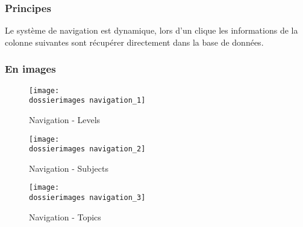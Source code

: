 \subsubsection{Principes}
Le système de navigation est dynamique, lors d'un clique les informations de la colonne suivantes sont récupérer directement dans la base de données.

\subsubsection{En images}

\begin{figure}[H]
   	\begin{minipage}[c]{.46\linewidth}
		\texttt{[image: \\dossierimages navigation\_1]}
		\caption{Navigation - Levels}
		\label{Navigation - Levels}
   	\end{minipage} \hfill
  	\begin{minipage}[c]{.46\linewidth}
      	\texttt{[image: \\dossierimages navigation\_2]}
     	\caption{Navigation - Subjects}
		\label{Navigation - Subjects}
   	\end{minipage}
\end{figure}
\begin{figure}[H]
   	\begin{minipage}[c]{.46\linewidth}
		\texttt{[image: \\dossierimages navigation\_3]}
		\caption{Navigation - Topics}
		\label{Navigation - Topics}
   	\end{minipage} \hfill
  	\begin{minipage}[c]{.46\linewidth}
      	
   	\end{minipage}
\end{figure}